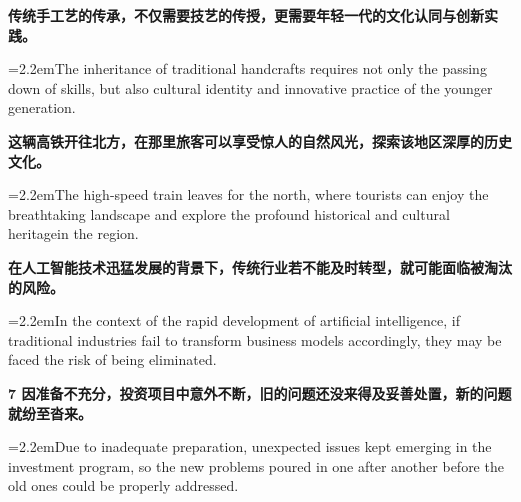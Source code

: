 \documentclass[11pt,a4paper]{article}
\newcommand{\num}[1]{\makebox[1.9em][r]{#1.}\hspace{0.3em}}
\begin{document}
\num{4}\textbf{传统手工艺的传承，不仅需要技艺的传授，更需要年轻一代的文化认同与创新实践。}

\vspace{0.15em}

\noindent\hangindent=2.2em\hspace{2.2em}The inheritance of traditional handcrafts requires not only the passing down of skills, but also cultural identity and innovative practice of the younger generation.

\num{5}\textbf{这辆高铁开往北方，在那里旅客可以享受惊人的自然风光，探索该地区深厚的历史文化。}

\vspace{0.15em}

\noindent\hangindent=2.2em\hspace{2.2em}The high-speed train leaves for the north, where tourists can enjoy the breathtaking landscape and explore the profound historical and cultural heritagein the region.

\num{6}\textbf{在人工智能技术迅猛发展的背景下，传统行业若不能及时转型，就可能面临被淘汰的风险。}

\vspace{0.15em}

\noindent\hangindent=2.2em\hspace{2.2em}In the context of the rapid development of artificial intelligence, if traditional industries fail to transform business models accordingly, they may be faced the risk of being eliminated.

\num{7}\textbf{7 因准备不充分，投资项目中意外不断，旧的问题还没来得及妥善处置，新的问题就纷至沓来。}

\vspace{0.15em}

\noindent\hangindent=2.2em\hspace{2.2em}Due to inadequate preparation, unexpected issues kept emerging in the investment program, so the new problems poured in one after another before the old ones could be properly addressed.
\end{document}
